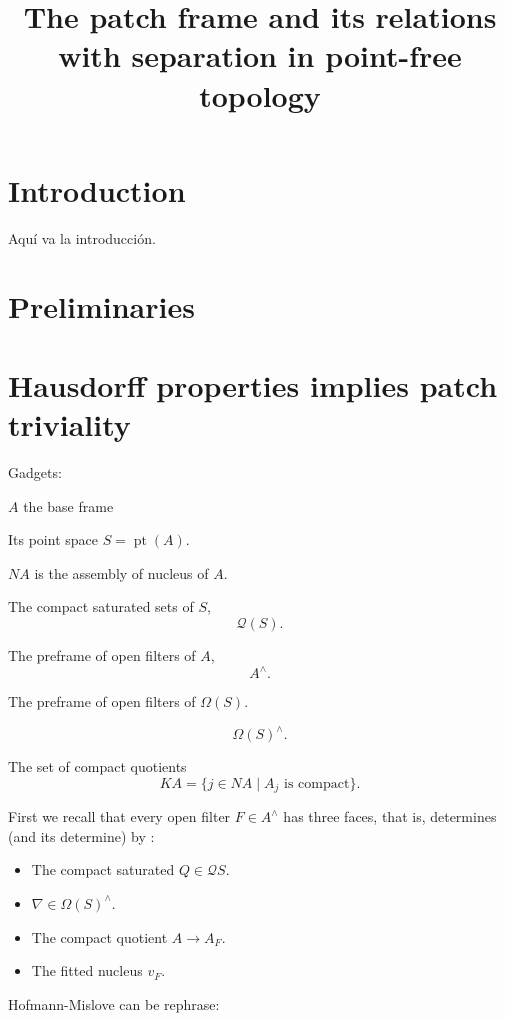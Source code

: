 \documentclass[11pt]{amsart}
\DeclareMathOperator{\pt}{pt}
\theoremstyle{plain}
\theoremstyle{definition}
\begin{document}

\title{The patch frame and its relations with separation in point-free topology}


\author{}
\email{}
\address{}


\address{}

\begin{abstract}

\end{abstract}

\maketitle
\section{Introduction}
Aquí va la introducción.
\section{Preliminaries}\label{pre}





\section{Hausdorff properties implies patch triviality}
Gadgets:

$A$ the base frame

Its point space $S=\pt(A)$.

$NA$ is the assembly of nucleus of $A$.
 
The compact saturated sets of $S$, \[\mathcal{Q}(S).\]

The preframe of open filters of $A$,
\[A^{\wedge}.\]

The preframe of open filters of $\Omega(S)$.

\[\Omega(S)^{\wedge}.\]

The set of compact quotients
\[
KA=\{j\in NA\mid A_j \mbox{ is compact}\}.
\]

First we recall that every open filter $F\in A^{\wedge}$ has three faces, that is, determines (and its determine) by :

\begin{itemize}
\item The compact saturated $Q\in \mathcal{Q}S$.
\item $\nabla\in\Omega(S)^{\wedge}$.
\item The compact quotient $A\rightarrow A_{F}$.
\item The fitted nucleus $v_{F}$.
\end{itemize}
Hofmann-Mislove can be rephrase:
\end{document}

